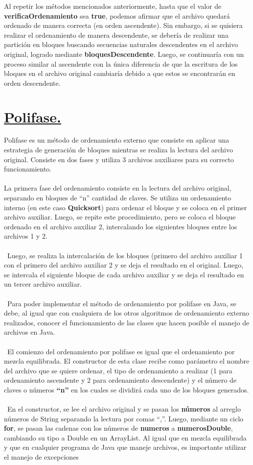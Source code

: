 \documentclass[12pt,letterpaper]{report}
\begin{document}
Al repetir los métodos mencionados anteriormente, hasta que el valor de \textbf{verificaOrdenamiento} sea \textbf{true}, podemos afirmar que el archivo quedará ordenado de manera correcta (en orden ascendente). Sin embargo, si se quisiera realizar el ordenamiento de manera descendente, se debería de realizar una partición en bloques buscando secuencias naturales descendentes en el archivo original, logrado mediante \textbf{bloquesDescendente}. Luego, se continuaría con un proceso similar al ascendente con la única diferencia de que la escritura de los bloques en el archivo original cambiaría debido a que estos se encontrarán en orden descendente.
\section*{\centering \underline{Polifase.}}
Polifase es un método de ordenamiento externo que consiste en aplicar una estrategia de generación de bloques mientras se realiza la lectura del archivo original. Consiste en dos fases y utiliza 3 archivos auxiliares para su correcto funcionamiento.\\\\ La primera fase del ordenamiento consiste en la lectura del archivo original, separando en bloques de “n” cantidad de claves. Se utiliza un ordenamiento interno (en este caso \textbf{Quicksort}) para ordenar el bloque y se coloca en el primer archivo auxiliar. Luego, se repite este procedimiento, pero se coloca el bloque ordenado en el archivo auxiliar 2, intercalando los siguientes bloques entre los archivos 1 y 2.\\\\\ Luego, se realiza la intercalación de los bloques (primero del archivo auxiliar 1 con el primero del archivo auxiliar 2 y se deja el resultado en el original. Luego, se intercala el siguiente bloque de cada archivo auxiliar y se deja el resultado en un tercer archivo auxiliar.\\\\\ Para poder implementar el método de ordenamiento por polifase en Java, se debe, al igual que con cualquiera de los otros algoritmos de ordenamiento externo realizados, conocer el funcionamiento de las clases que hacen posible el manejo de archivos en Java.\\\\\ El comienzo del ordenamiento por polifase es igual que el ordenamiento por mezcla equilibrada. El constructor de esta clase recibe como parámetro el nombre del archivo que se quiere ordenar, el tipo de ordenamiento a realizar (1 para ordenamiento ascendente y 2 para ordenamiento descendente) y el número de claves o números \textbf{“n”} en los cuales se dividirá cada uno de los bloques generados.\\\\\ En el constructor, se lee el archivo original y se pasan los \textbf{números} al arreglo números de String separando la lectura por comas “,”. Luego, mediante un ciclo \textbf{for}, se pasan las cadenas con los números de \textbf{numeros} a \textbf{numerosDouble}, cambiando su tipo a Double en un ArrayList. Al igual que en mezcla equilibrada y que en cualquier programa de Java que maneje archivos, es importante utilizar el manejo de excepciones 
\end{document}
